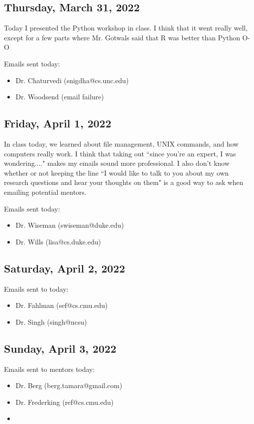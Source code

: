 \documentclass[11pt,letterpaper]{article}
\begin{document}
\subsection{Thursday, March 31, 2022}
Today I presented the Python workshop in class. I think that it went really well, except for a few parts where Mr. Gotwals said that R was better than Python O-O

Emails sent today:
\begin{itemize}
    \item Dr. Chaturvedi (snigdha@cs.unc.edu)
    \item Dr. Woodsend (email failure)
\end{itemize}

\subsection{Friday, April 1, 2022}
In class today, we learned about file management, UNIX commands, and how computers really work. I think that taking out ``since you're an expert, I was wondering...." makes my emails sound more professional. I also don't know whether or not keeping the line ``I would like to talk to you about my own research questions and hear your thoughts on them" is a good way to ask when emailing potential mentors.

Emails sent today:
\begin{itemize}
    \item Dr. Wiseman (swiseman@duke.edu)
    \item Dr. Wills (lisa@cs.duke.edu)
\end{itemize}

\subsection{Saturday, April 2, 2022}
Emails sent to today:
\begin{itemize}
    \item Dr. Fahlman (sef@cs.cmu.edu)
    \item Dr. Singh (singh@ncsu)
\end{itemize}

\subsection{Sunday, April 3, 2022}
Emails sent to mentors today:
\begin{itemize}
    \item Dr. Berg (berg.tamara@gmail.com)
    \item Dr. Frederking (ref@cs.cmu.edu)
    \item 
\end{itemize}
\end{document}
